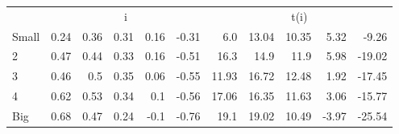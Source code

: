 \begin{table}[!ht]
\begin{tabular}{lrrrrrrrrrr}
  
    
      & \multicolumn{5}{c}{i} & \multicolumn{5}{c}{t(i)}
    
    \\
      \cmidrule(r){2-6} \cmidrule(r){7-11}

    Small   & 0.24  & 0.36  & 0.31  & 0.16  & -0.31  & 6.0  & 13.04  & 10.35  & 5.32  & -9.26  \\
         2  & 0.47  & 0.44  & 0.33  & 0.16  & -0.51  & 16.3  & 14.9  & 11.9  & 5.98  & -19.02  \\
         3  & 0.46  & 0.5  & 0.35  & 0.06  & -0.55  & 11.93  & 16.72  & 12.48  & 1.92  & -17.45  \\
         4  & 0.62  & 0.53  & 0.34  & 0.1  & -0.56  & 17.06  & 16.35  & 11.63  & 3.06  & -15.77  \\
    Big     & 0.68  & 0.47  & 0.24  & -0.1  & -0.76  & 19.1  & 19.02  & 10.49  & -3.97  & -25.54  \\

  

  \bottomrule
\end{tabular}
\label{tbl:25_Size_Beta_FF2015}
\end{table}